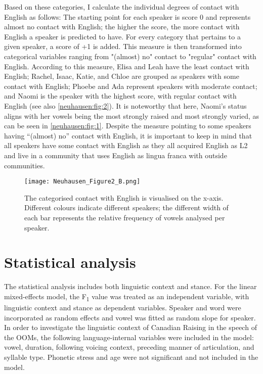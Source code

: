 \documentclass[output=paper]{langscibook}
\begin{document}
Based on these categories, I calculate the individual degrees of contact with English as follows: The starting point for each speaker is score 0 and represents almost no contact with English; the higher the score, the more contact with English a speaker is predicted to have. For every category that pertains to a given speaker, a score of +1 is added. This measure is then transformed into categorical variables ranging from "(almost) no" contact to "regular" contact with English. According to this measure, Elisa and Leah have the least contact with English; Rachel, Isaac, Katie, and Chloe are grouped as speakers with some contact with English; Phoebe and Ada represent speakers with moderate contact; and Naomi is the speaker with the highest score, with regular contact with English (see also \autoref{neuhausen:fig:2}). It is noteworthy that here, Naomi’s status aligns with her vowels being the most strongly raised and most strongly varied, as can be seen in \autoref{neuhausen:fig:1}. Despite the measure pointing to some speakers having “(almost) no” contact with English, it is important to keep in mind that all speakers have some contact with English as they all acquired English as L2 and live in a community that uses English as lingua franca with outside communities.

\begin{figure}
    \centering
    \texttt{[image: Neuhausen\_Figure2\_B.png]}
    \caption{The categorised contact with English is visualised on the x-axis. Different colours indicate different speakers; the different width of each bar represents the relative frequency of vowels analysed per speaker.}
    \label{neuhausen:fig:2}
\end{figure}

\section{Statistical analysis}\label{neuhausen:sec:5}
The statistical analysis includes both linguistic context and stance. For the linear mixed-effects model, the F\textsubscript{1} value was treated as an independent variable, with linguistic context and stance as dependent variables. Speaker and word were incorporated as random effects and vowel was fitted as random slope for speaker. In order to investigate the linguistic context of Canadian Raising in the speech of the \glspl*{OOM}, the following language-internal variables were included in the model: vowel, duration, following voicing context, preceding manner of articulation, and syllable type. Phonetic stress and age were not significant and not included in the model.
\end{document}
